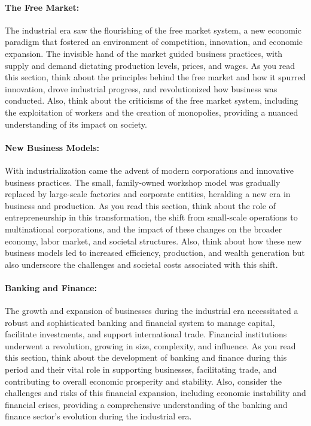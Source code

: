 \documentclass[a4paper,12pt]{book}
\begin{document}
\paragraph{The Free Market:}
The industrial era saw the flourishing of the free market system, a new economic paradigm that fostered an environment of competition, innovation, and economic expansion. The invisible hand of the market guided business practices, with supply and demand dictating production levels, prices, and wages. As you read this section, think about the principles behind the free market and how it spurred innovation, drove industrial progress, and revolutionized how business was conducted. Also, think about the criticisms of the free market system, including the exploitation of workers and the creation of monopolies, providing a nuanced understanding of its impact on society.

\paragraph{New Business Models:}
With industrialization came the advent of modern corporations and innovative business practices. The small, family-owned workshop model was gradually replaced by large-scale factories and corporate entities, heralding a new era in business and production. As you read this section, think about the role of entrepreneurship in this transformation, the shift from small-scale operations to multinational corporations, and the impact of these changes on the broader economy, labor market, and societal structures. Also, think about how these new business models led to increased efficiency, production, and wealth generation but also underscore the challenges and societal costs associated with this shift.

\paragraph{Banking and Finance:}
The growth and expansion of businesses during the industrial era necessitated a robust and sophisticated banking and financial system to manage capital, facilitate investments, and support international trade. Financial institutions underwent a revolution, growing in size, complexity, and influence. As you read this section, think about the development of banking and finance during this period and their vital role in supporting businesses, facilitating trade, and contributing to overall economic prosperity and stability. Also, consider the challenges and risks of this financial expansion, including economic instability and financial crises, providing a comprehensive understanding of the banking and finance sector’s evolution during the industrial era.
\end{document}

